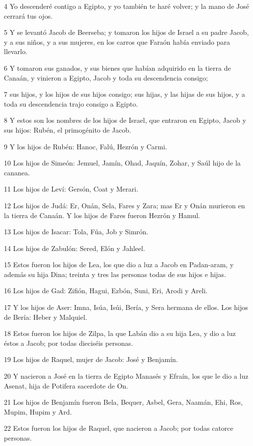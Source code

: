 4 Yo descenderé contigo a Egipto, y yo también te haré volver; y la mano de José cerrará tus ojos.

5 Y se levantó Jacob de Beerseba; y tomaron los hijos de Israel a su padre Jacob, y a sus niños, y a sus mujeres, en los carros que Faraón había enviado para llevarlo.

6 Y tomaron sus ganados, y sus bienes que habían adquirido en la tierra de Canaán, y vinieron a Egipto, Jacob y toda su descendencia consigo;

7 sus hijos, y los hijos de sus hijos consigo; sus hijas, y las hijas de sus hijos, y a toda su descendencia trajo consigo a Egipto.

8 Y estos son los nombres de los hijos de Israel, que entraron en Egipto, Jacob y sus hijos: Rubén, el primogénito de Jacob.

9 Y los hijos de Rubén: Hanoc, Falú, Hezrón y Carmi.

10 Los hijos de Simeón: Jemuel, Jamín, Ohad, Jaquín, Zohar, y Saúl hijo de la cananea.

11 Los hijos de Leví: Gersón, Coat y Merari.

12 Los hijos de Judá: Er, Onán, Sela, Fares y Zara; mas Er y Onán murieron en la tierra de Canaán. Y los hijos de Fares fueron Hezrón y Hamul.

13 Los hijos de Isacar: Tola, Fúa, Job y Simrón.

14 Los hijos de Zabulón: Sered, Elón y Jahleel.

15 Estos fueron los hijos de Lea, los que dio a luz a Jacob en Padan-aram, y además su hija Dina; treinta y tres las personas todas de sus hijos e hijas.

16 Los hijos de Gad: Zifión, Hagui, Ezbón, Suni, Eri, Arodi y Areli.

17 Y los hijos de Aser: Imna, Isúa, Isúi, Bería, y Sera hermana de ellos. Los hijos de Bería: Heber y Malquiel.

18 Estos fueron los hijos de Zilpa, la que Labán dio a su hija Lea, y dio a luz éstos a Jacob; por todas dieciséis personas.

19 Los hijos de Raquel, mujer de Jacob: José y Benjamín.

20 Y nacieron a José en la tierra de Egipto Manasés y Efraín, los que le dio a luz Asenat, hija de Potifera sacerdote de On.

21 Los hijos de Benjamín fueron Bela, Bequer, Asbel, Gera, Naamán, Ehi, Ros, Mupim, Hupim y Ard.

22 Estos fueron los hijos de Raquel, que nacieron a Jacob; por todas catorce personas.

